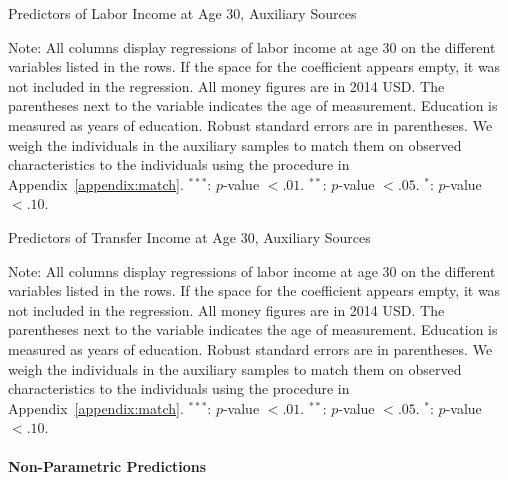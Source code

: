 \begin{table}
\begin{threeparttable}
\caption{Predictors of Labor Income at Age 30, Auxiliary Sources}
\label{table:predlaborincome}
\centering
\footnotesize

\begin{tablenotes}
\footnotesize
\item Note: All columns display regressions of labor income at age 30 on the different variables listed in the rows. If the space for the coefficient appears empty, it was not included in the regression. All money figures are in 2014 USD. The parentheses next to the variable indicates the age of measurement. Education is measured as years of education. Robust standard errors are in parentheses. We weigh the individuals in the auxiliary samples to match them on observed characteristics to the individuals using the procedure in Appendix~\ref{appendix:match}. $^{***}$: $p$-value $< .01$. $^{**}$: $p$-value $< .05$. $^{*}$: $p$-value $< .10$.
\end{tablenotes}
\end{threeparttable}
\end{table}

\begin{table}[H]
\begin{threeparttable}
\caption{Predictors of Transfer Income at Age 30, Auxiliary Sources}
\label{table:predtransferincome}
\centering
\footnotesize

\begin{tablenotes}
\footnotesize
\item Note: All columns display regressions of labor income at age 30 on the different variables listed in the rows. If the space for the coefficient appears empty, it was not included in the regression. All money figures are in 2014 USD. The parentheses next to the variable indicates the age of measurement. Education is measured as years of education. Robust standard errors are in parentheses. We weigh the individuals in the auxiliary samples to match them on observed characteristics to the individuals using the procedure in Appendix~\ref{appendix:match}. $^{***}$: $p$-value $< .01$. $^{**}$: $p$-value $< .05$. $^{*}$: $p$-value $< .10$.
\end{tablenotes}
\end{threeparttable}
\end{table}

\paragraph{Non-Parametric Predictions} \label{appendix:nonpar}

